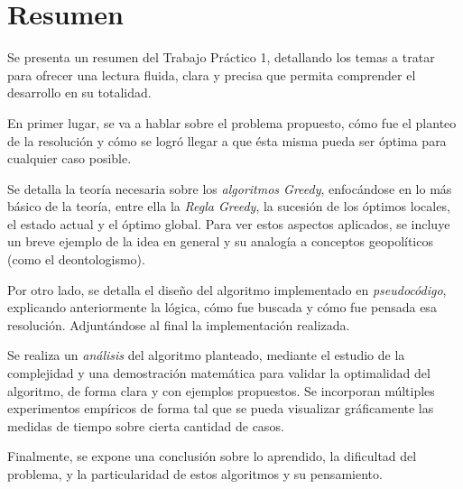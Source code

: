 \vspace*{1.5cm}
\section{Resumen}

Se presenta un resumen del Trabajo Práctico 1, detallando los temas a tratar para ofrecer una lectura fluida, clara y precisa que permita comprender el desarrollo en su totalidad.

En primer lugar, se va a hablar sobre el problema propuesto, cómo fue el planteo de la resolución y cómo se logró llegar a que ésta misma pueda ser óptima para cualquier caso posible.

Se detalla la teoría necesaria sobre los \textit{algoritmos Greedy}, enfocándose en lo más básico de la teoría, entre ella la \textit{Regla Greedy}, la sucesión de los óptimos locales, el estado actual y el óptimo global. Para ver estos aspectos aplicados, se incluye un breve ejemplo de la idea en general y su analogía a conceptos geopolíticos (como el deontologismo).

Por otro lado, se detalla el diseño del algoritmo implementado en \textit{pseudocódigo}, explicando anteriormente la lógica, cómo fue buscada y cómo fue pensada esa resolución. Adjuntándose al final la implementación realizada.

Se realiza un \textit{análisis} del algoritmo planteado, mediante el estudio de la complejidad y una demostración matemática para validar la optimalidad del algoritmo, de forma clara y con ejemplos propuestos. Se incorporan múltiples experimentos empíricos de forma tal que se pueda visualizar gráficamente las medidas de tiempo sobre cierta cantidad de casos.

Finalmente, se expone una conclusión sobre lo aprendido, la dificultad del problema, y la particularidad de estos algoritmos y su pensamiento.
